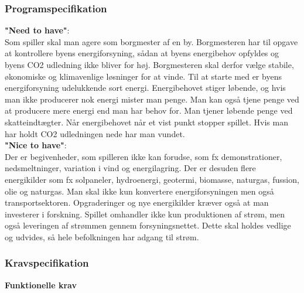 \documentclass[a4paper,12pt]{report}
\begin{document}
\subsubsection{Programspecifikation}
\textbf{"Need to have"}:\\ Som spiller skal man agere som borgmester af en by. Borgmesteren har til opgave at kontrollere byens energiforsyning, sådan at byens energibehov opfyldes og byens CO2 udledning ikke bliver for høj. Borgmesteren skal derfor vælge stabile, økonomiske og klimavenlige løsninger for at vinde. Til at starte med er byens energiforsyning udelukkende sort energi. Energibehovet stiger løbende, og hvis man ikke producerer nok energi mister man penge. Man kan også tjene penge ved at producere mere energi end man har behov for. Man tjener løbende penge ved skatteindtægter. Når energibehovet når et vist punkt stopper spillet. Hvis man har holdt CO2 udledningen nede har man vundet.\\

\textbf{"Nice to have"}:\\ Der er begivenheder, som spilleren ikke kan forudse, som fx demonstrationer, nedsmeltninger, variation i vind og energilagring. Der er desuden flere energikilder som fx solpaneler, hydroenergi, geotermi, biomasse, naturgas, fussion, olie og naturgas. Man skal ikke kun konvertere energiforsyningen men også transportsektoren. Opgraderinger og nye energikilder kræver også at man investerer i forskning. Spillet omhandler ikke kun produktionen af strøm, men også leveringen af strømmen gennem forsyningsnettet. Dette skal holdes vedlige og udvides, så hele befolkningen har adgang til strøm.

\subsubsection{Kravspecifikation}
\textbf{Funktionelle krav}
\end{document}
